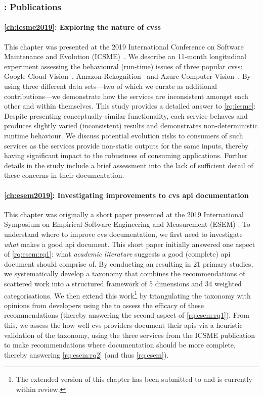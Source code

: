 \subsubsection{: Publications}

\paragraph{\cref{ch:icsme2019}: Exploring the nature of \glspl{cvs}} This chapter was presented at the 2019 International Conference on Software Maintenance and Evolution (ICSME)~\citep{Cummaudo:2019va}. We describe an 11-month longitudinal experiment assessing the behavioural (run-time) issues of three popular \glspl{cvs}: Google Cloud Vision~, Amazon Rekognition~ and Azure Computer Vision~. By using three different data sets---two of which we curate as additional contributions---we demonstrate how the services are inconsistent amongst each other and within themselves. This study provides a detailed answer to \ref{rq:icsme}: Despite presenting conceptually-similar functionality, each service behaves and produces slightly varied (inconsistent) results and demonstrates non-deterministic runtime behaviour. We discuss potential evolution risks to consumers of such services as the services provide non-static outputs for the same inputs, thereby having significant impact to the robustness of consuming applications. Further details in the study include a brief assessment into the lack of sufficient detail of these concerns in their documentation.

\paragraph{\cref{ch:esem2019}: Investigating improvements to \gls{cvs} \gls{api} documentation} This chapter was originally a short paper presented at the 2019 International Symposium on Empirical Software Engineering and Measurement (ESEM) \citep{Cummaudo:2019th}. To understand where to improve \gls{cvs} documentation, we first need to investigate \textit{what} makes a good \gls{api} document. This short paper initially answered one aspect of \ref{rq:esem:rq1}: what \textit{academic literature} suggests a good (complete) \gls{api} document should comprise of. By conducting an  resulting in 21 primary studies, we systematically develop a taxonomy that combines the recommendations of scattered work into a structured framework of 5 dimensions and 34 weighted categorisations. We then extend this work\footnote{The extended version of this chapter has been submitted to  and is currently within review.} by triangulating the taxonomy with opinions from developers using the  to assess the efficacy of these recommendations (thereby answering the second aspect of \ref{rq:esem:rq1}). From this, we assess the how well \gls{cvs} providers document their \glspl{api} via a heuristic validation of the taxonomy, using the three services from the ICSME publication to make recommendations where documentation should be more complete, thereby answering \ref{rq:esem:rq2} (and thus \ref{rq:esem}).

